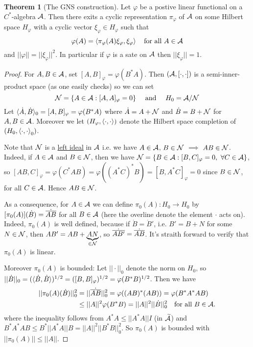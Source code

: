 \documentclass[10pt,english,a4paper]{article}
\theoremstyle{definition}
\newtheorem*{theorem}{Theorem}
\def\tAs{\widetilde{\As}}
\def\dA{\dot{A}}
\def\dB{\dot{B}}
\def\dA{\dot{A}}
\def\dB{\dot{B}}
\def\vphi{\varphi}
\begin{document}
\begin{theorem}[The GNS construction]
    Let $\vphi$ be a postive linear functional on a $C^*$-algebra $\mathcal{A}$. Then 
there exits a cyclic representation $\pi_{\vphi}$ of $\mathcal{A}$ on some Hilbert space 
$H_{\vphi}$ with a cyclic vector $\xi_{\vphi} \in H_{\vphi}$ such that 
\[ \vphi(A) = \ind{\pi_{\vphi}(A)\xi_{\vphi},\xi_{\vphi}}\quad \text{for all }
A \in \As \]
and $||\vphi|| = ||\xi_{\vphi}||^2$. In particular if $\vphi$ is a sate on $\mathcal{A}$
then $|| \xi_{\vphi} || = 1$.
\end{theorem}
\begin{proof}
    For $A,B \in \mathcal{A}$, set $[A,B]_{\vphi} = \vphi(B^*A)$. Then 
$(\mathcal{A},[\cdot,\cdot])$ is a semi-inner-product space (as one easily checks) 
so we can set 
\[ \Ns = \{ A \in \As : [A,A]_{\vphi} = 0 \} \quad \text{ and } \quad 
H_0 = \As /\Ns\]
Let $\indi{\dA,\dB}_0 = [A,B]_{\vphi} = \vphi(B^*A)$ where 
$\dA = A + \Ns$ and $\dB = B  + \Ns$ for $A,B \in \mathcal{A}$.
Moreover we let $(H_{\vphi}, \ind{\cdot,\cdot})$ denote the Hilbert space completion
of $(H_0, \left\langle \cdot,\cdot \right\rangle_0)$. 

Note that $\mathcal{N}$ is a \ul{left ideal} in $\mathcal{A}$
i.e. we have $A \in \mathcal{A}$, $B \in \mathcal{N}$ $\implies$ $AB \in \mathcal{N}$.
Indeed, if $A \in \mathcal{A}$ and $B \in \mathcal{N}$, then we have 
$\Ns = \{ B \in \As : [B,C]_{\vphi}= 0, ~\forall C \in \As\}$, so
$[AB,C]_{\vphi} = \vphi(C^*AB) = \vphi((A^*C)^*B) = [B,A^*C]_{\vphi} = 0$ since $B\in \mathcal{N}$, 
for all $C \in \mathcal{A}$. Hence $AB \in \mathcal{N}$.

As a consequence, for $A \in \mathcal{A}$ we can define $\pi_{0}(A)\colon H_0 \to H_0$
by $[\pi_0(A)](\dB) = \dot{\ol{AB}}$ for all $B \in \mathcal{A}$ (here the overline denote the 
element $\cdot$ acts on).
Indeed, $\pi_0(A)$ is well defined, because 
if $\dB = \dB'$, i.e. $B' = B + N$ for some $N \in \mathcal{N}$, then
$AB' = AB + \underbrace{AN}_{\in \mathcal{N}}$, so $\dot{\overline{AB'}} = \dot{\overline{AB}}$.
It's straith forward to verify that $\pi_0(A)$ is linear.

Moreover $\pi_0(A)$ is bounded:
Let $||\cdot||_0$ denote the norm on $H_0$, so 
$||\dB||_0 = (\indi{\dB, \dB})^{1/2} = ([B,B]_{\vphi})^{1/2} =
\vphi(B^*B)^{1/2}$. 
Then we have
\begin{align*}
    ||\pi_0(A)(\dB)||_{0}^{2} &= ||\dot{\ol{AB}}||_{0}^{2} = \vphi((AB)^*(AB)) 
   = \vphi(B^*A^*AB) \\
    &\leq ||A||^2\vphi(B^*B) = ||A||^2 ||\dot{B}||_{0}^{2} \quad \text{for all
    } B \in \As.
\end{align*}
where the inequality follows from $A^*A \leq ||A^*A|| I$ (in $\tAs$) and 
$B^*A^*AB \leq B^*||A^*A||B = ||A||^2 ||B^*B||_{0}^{2}$.
So $\pi_0(A)$ is bounded with $||\pi_0(A)|| \leq ||A||$. 


\end{proof}
\end{document}
